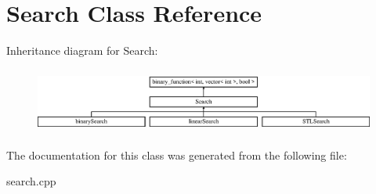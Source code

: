 \hypertarget{class_search}{\section{Search Class Reference}
\label{class_search}
}
Inheritance diagram for Search\+:\begin{figure}[H]
\begin{center}
\leavevmode
\includegraphics[height=2.153846cm]{class_search}
\end{center}
\end{figure}


The documentation for this class was generated from the following file\+:\begin{DoxyCompactItemize}
\item 
search.\+cpp\end{DoxyCompactItemize}
